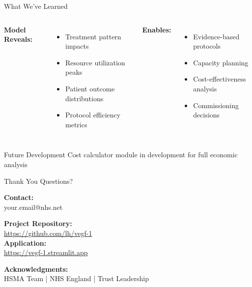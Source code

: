 \documentclass[10pt,aspectratio=169]{beamer}
\begin{document}
\begin{frame}{What We've Learned}
\begin{columns}[T]
\textbf{Model Reveals:}
\begin{itemize}
    \item Treatment pattern impacts
    \item Resource utilization peaks
    \item Patient outcome distributions
    \item Protocol efficiency metrics
\end{itemize}

\textbf{Enables:}
\begin{itemize}
    \item Evidence-based protocols
    \item Capacity planning
    \item Cost-effectiveness analysis
    \item Commissioning decisions
\end{itemize}
\end{columns}

\vspace{0.5cm}
\begin{alertblock}{Future Development}
Cost calculator module in development for full economic analysis
\end{alertblock}
\end{frame}

\begin{frame}{Thank You}
\centering
\Large
Questions?

\vspace{1cm}
\normalsize
\textbf{Contact:}\\
your.email@nhs.net

\vspace{0.5cm}
\textbf{Project Repository:}\\
\url{https://github.com/lh/vegf-1} \\
\textbf{Application:}\\
\url{https://vegf-1.streamlit.app}

\vspace{0.5cm}
\textbf{Acknowledgments:}\\
HSMA Team | NHS England | Trust Leadership
\end{frame}
\end{document}
